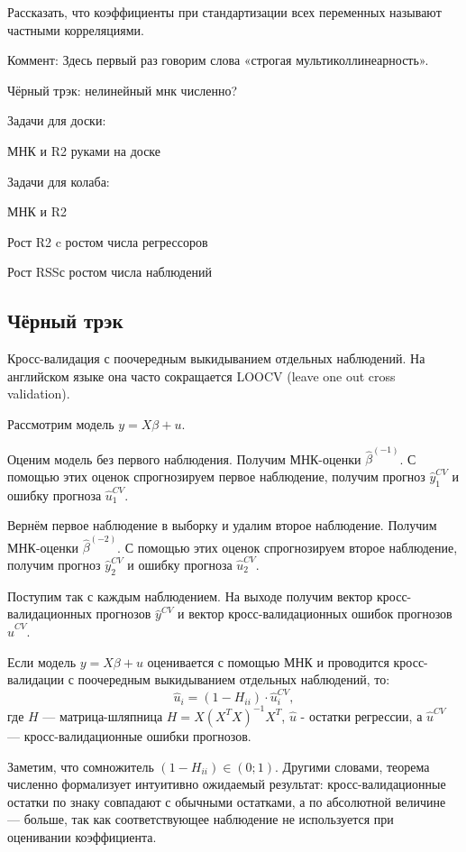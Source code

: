 \documentclass[12pt]{article}
\newcommand{\hb}{\hat{\beta}}
\newcommand{\RSS}{RSS}
\begin{document}
Рассказать, что коэффициенты при стандартизации всех переменных называют частными корреляциями. 

Коммент: Здесь первый раз говорим слова «строгая мультиколлинеарность».

Чёрный трэк: нелинейный мнк численно?

Задачи для доски:

МНК и R2 руками на доске

Задачи для колаба:

МНК и R2

Рост R2 c ростом числа регрессоров

Рост \RSS с ростом числа наблюдений


\subsection{Чёрный трэк}

\begin{definition}[LOOCV]
Кросс-валидация с поочередным выкидыванием отдельных наблюдений. 
На английском языке она часто сокращается LOOCV (leave one out cross validation).

Рассмотрим модель $y=X\beta + u$. 

Оценим модель без первого наблюдения. Получим МНК-оценки $\hb^{(-1)}$.
С помощью этих оценок спрогнозируем первое наблюдение, получим прогноз $\hat y_1^{CV}$ и ошибку прогноза $\hat u_1^{CV}$.

Вернём первое наблюдение в выборку и удалим второе наблюдение. Получим МНК-оценки $\hb^{(-2)}$.
С помощью этих оценок спрогнозируем второе наблюдение, получим прогноз $\hat y_2^{CV}$ и ошибку прогноза $\hat u_2^{CV}$.

Поступим так с каждым наблюдением. На выходе получим вектор кросс-валидационных прогнозов $\hat y^{CV}$ и вектор кросс-валидационных ошибок прогнозов $\hat u^{CV}$.    
\end{definition}

\begin{theorem}
Если модель $y=X\beta + u$ оценивается с помощью МНК и проводится кросс-валидации с поочередным выкидыванием отдельных наблюдений, то:
\[
\hat u_i = (1 - H_{ii}) \cdot \hat u_i^{CV},
\]
где $H$ — матрица-шляпница $H = X(X^TX)^{-1}X^T$, $\hat u$ - остатки регрессии, а $\hat u^{CV}$ — кросс-валидационные ошибки прогнозов.
\end{theorem}

Заметим, что сомножитель $(1 - H_{ii}) \in (0;1)$. 
Другими словами, теорема численно формализует интуитивно ожидаемый результат: кросс-валидационные остатки по знаку совпадают с обычными остатками, а по абсолютной величине — больше, так как соответствующее наблюдение не используется при оценивании коэффициента. 
\end{document}
